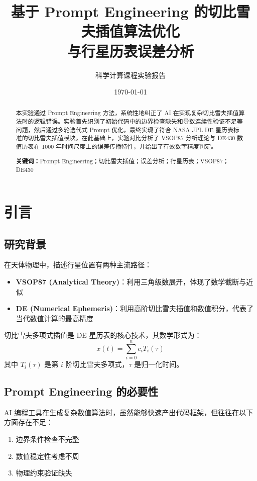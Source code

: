 \documentclass[12pt,a4paper]{article}
\title{\textbf{基于 Prompt Engineering 的切比雪夫插值算法优化\\与行星历表误差分析}}
\author{科学计算课程实验报告}
\date{\today}
\begin{document}
\maketitle

\begin{abstract}
本实验通过 Prompt Engineering 方法，系统性地纠正了 AI 在实现复杂切比雪夫插值算法时的逻辑错误。实验首先识别了初始代码中的边界检查缺失和导数连续性验证不足等问题，然后通过多轮迭代式 Prompt 优化，最终实现了符合 NASA JPL DE 星历表标准的切比雪夫插值模块。在此基础上，实验对比分析了 VSOP87 分析理论与 DE430 数值历表在 1000 年时间尺度上的误差传播特性，并给出了有效数字精度判定。

\textbf{关键词：}Prompt Engineering；切比雪夫插值；误差分析；行星历表；VSOP87；DE430
\end{abstract}

\tableofcontents
\newpage

\section{引言}

\subsection{研究背景}

在天体物理中，描述行星位置有两种主流路径：
\begin{itemize}
    \item \textbf{VSOP87 (Analytical Theory)}：利用三角级数展开，体现了数学截断与近似
    \item \textbf{DE (Numerical Ephemeris)}：利用高阶切比雪夫插值和数值积分，代表了当代数值计算的最高精度
\end{itemize}

切比雪夫多项式插值是 DE 星历表的核心技术，其数学形式为：
\begin{equation}
    x(t) = \sum_{i=0}^{n} c_i T_i(\tau)
\end{equation}
其中 $T_i(\tau)$ 是第 $i$ 阶切比雪夫多项式，$\tau$ 是归一化时间。

\subsection{Prompt Engineering 的必要性}

AI 编程工具在生成复杂数值算法时，虽然能够快速产出代码框架，但往往在以下方面存在不足：
\begin{enumerate}
    \item 边界条件检查不完整
    \item 数值稳定性考虑不周
    \item 物理约束验证缺失
\end{enumerate}
\end{document}
